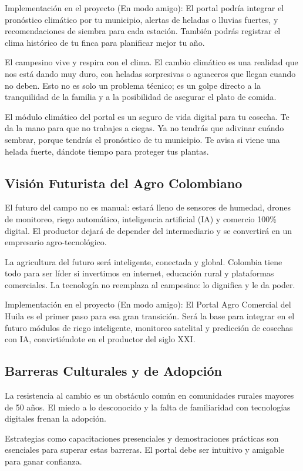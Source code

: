 Implementación en el proyecto (En modo amigo): El portal podría integrar el pronóstico climático por tu municipio, alertas de heladas o lluvias fuertes, y recomendaciones de siembra para cada estación. También podrás registrar el clima histórico de tu finca para planificar mejor tu año.

El campesino vive y respira con el clima. El cambio climático es una realidad que nos está dando muy duro, con heladas sorpresivas o aguaceros que llegan cuando no deben. Esto no es solo un problema técnico; es un golpe directo a la tranquilidad de la familia y a la posibilidad de asegurar el plato de comida.

El módulo climático del portal es un seguro de vida digital para tu cosecha. Te da la mano para que no trabajes a ciegas. Ya no tendrás que adivinar cuándo sembrar, porque tendrás el pronóstico de tu municipio. Te avisa si viene una helada fuerte, dándote tiempo para proteger tus plantas.

\subsection{Visión Futurista del Agro Colombiano}
El futuro del campo no es manual: estará lleno de sensores de humedad, drones de monitoreo, riego automático, inteligencia artificial (IA) y comercio 100\% digital. El productor dejará de depender del intermediario y se convertirá en un empresario agro-tecnológico.

La agricultura del futuro será inteligente, conectada y global. Colombia tiene todo para ser líder si invertimos en internet, educación rural y plataformas comerciales. La tecnología no reemplaza al campesino: lo dignifica y le da poder.

Implementación en el proyecto (En modo amigo): El Portal Agro Comercial del Huila es el primer paso para esa gran transición. Será la base para integrar en el futuro módulos de riego inteligente, monitoreo satelital y predicción de cosechas con IA, convirtiéndote en el productor del siglo XXI.

\subsection{Barreras Culturales y de Adopción}
La resistencia al cambio es un obstáculo común en comunidades rurales mayores de 50 años. El miedo a lo desconocido y la falta de familiaridad con tecnologías digitales frenan la adopción.

Estrategias como capacitaciones presenciales y demostraciones prácticas son esenciales para superar estas barreras. El portal debe ser intuitivo y amigable para ganar confianza.

